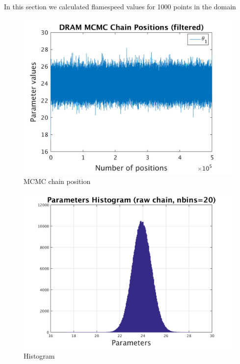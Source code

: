 In this section we calculated flamespeed values for 1000 points in the domain 

\begin{figure}[H]
  
  \centering
   \includegraphics[scale=0.75]{100_results/outputData_1000/simple_ip_chain_pos_filt}
   \caption{MCMC chain position }
\end{figure}


\begin{figure}[H]
  
  \centering
   \includegraphics[scale=0.75]{100_results/outputData_1000/simple_ip_hist_raw}
   \caption{Histogram}
\end{figure}



